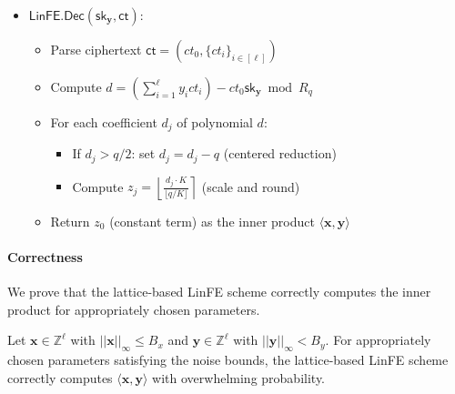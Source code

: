 \begin{itemize}
\item $\mathsf{LinFE.Dec}(\mathsf{sk}_{\mathbf{y}},\mathsf{ct})$:
   \begin{itemize}
       \item Parse ciphertext $\mathsf{ct} = (ct_0, \{ct_i\}_{i \in [\ell]})$
       \item Compute $d = \left(\sum_{i=1}^\ell y_i ct_i\right) - ct_0 \mathsf{sk}_{\mathbf{y}} \bmod R_q$
       \item For each coefficient $d_j$ of polynomial $d$:
       \begin{itemize}
           \item If $d_j > q/2$: set $d_j = d_j - q$ (centered reduction)
           \item Compute $z_j = \left\lfloor \frac{d_j \cdot K}{\lfloor q/K \rfloor} \right\rceil$ (scale and round)
       \end{itemize}
       \item Return $z_0$ (constant term) as the inner product $\langle \mathbf{x}, \mathbf{y} \rangle$
   \end{itemize}
\end{itemize}

\paragraph{Correctness}
We prove that the lattice-based LinFE scheme correctly computes the inner product for appropriately chosen parameters.

\begin{theorem}
Let $\mathbf{x} \in \mathbb{Z}^\ell$ with $||\mathbf{x}||_\infty \leq B_x$ and $\mathbf{y} \in \mathbb{Z}^\ell$ with $||\mathbf{y}||_\infty < B_y$. For appropriately chosen parameters satisfying the noise bounds, the lattice-based LinFE scheme correctly computes $\langle \mathbf{x}, \mathbf{y} \rangle$ with overwhelming probability.
\end{theorem}

